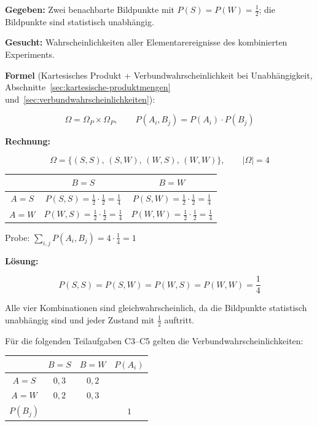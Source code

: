 \begin{beispiel}

\textbf{Gegeben:} Zwei benachbarte Bildpunkte mit
$P(S) = P(W) = \tfrac{1}{2}$; die Bildpunkte sind statistisch unabhängig.

\textbf{Gesucht:} Wahrscheinlichkeiten aller Elementarereignisse des kombinierten
Experiments.

\textbf{Formel} (Kartesisches Produkt + Verbundwahrscheinlichkeit bei Unabhängigkeit,
Abschnitte~\ref{sec:kartesische-produktmengen} und~\ref{sec:verbundwahrscheinlichkeiten}):

$$
\Omega = \Omega_P \times \Omega_P, \qquad
P(A_i, B_j) = P(A_i)\cdot P(B_j)
$$

\textbf{Rechnung:}

$$
\Omega = \{(S,S),\,(S,W),\,(W,S),\,(W,W)\}, \qquad |\Omega| = 4
$$

\begin{center}
\begin{tabular}{c|cc}
  & $B = S$ & $B = W$ \\
  \hline
  $A = S$ & $P(S,S) = \tfrac{1}{2}\cdot\tfrac{1}{2} = \tfrac{1}{4}$
           & $P(S,W) = \tfrac{1}{2}\cdot\tfrac{1}{2} = \tfrac{1}{4}$ \\[4pt]
  $A = W$ & $P(W,S) = \tfrac{1}{2}\cdot\tfrac{1}{2} = \tfrac{1}{4}$
           & $P(W,W) = \tfrac{1}{2}\cdot\tfrac{1}{2} = \tfrac{1}{4}$ \\
\end{tabular}
\end{center}

Probe: $\displaystyle\sum_{i,j} P(A_i,B_j) = 4\cdot\frac{1}{4} = 1$ \checkmark

\textbf{Lösung:}

$$
\boxed{P(S,S) = P(S,W) = P(W,S) = P(W,W) = \frac{1}{4}}
$$

Alle vier Kombinationen sind gleichwahrscheinlich, da die Bildpunkte statistisch
unabhängig sind und jeder Zustand mit $\tfrac{1}{2}$ auftritt.

\end{beispiel}


\medskip
Für die folgenden Teilaufgaben C3–C5 gelten die Verbundwahrscheinlichkeiten:

\begin{center}
\begin{tabular}{c|cc|c}
  & $B = S$ & $B = W$ & $P(A_i)$ \\
  \hline
  $A = S$ & $0{,}3$ & $0{,}2$ & \\
  $A = W$ & $0{,}2$ & $0{,}3$ & \\
  \hline
  $P(B_j)$ & & & $1$ \\
\end{tabular}
\end{center}

